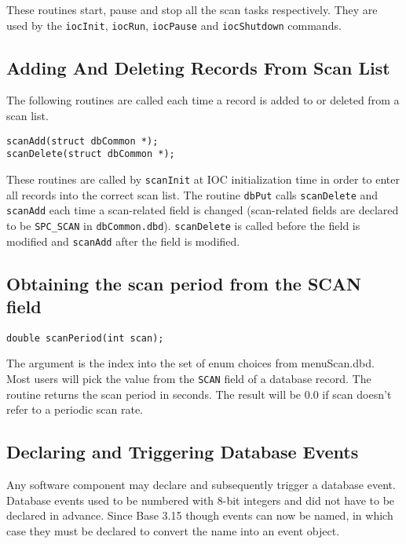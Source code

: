 These routines start, pause and stop all the scan tasks respectively.
They are used by the \verb|iocInit|, \verb|iocRun|, \verb|iocPause| and \verb|iocShutdown| commands.

\subsection{Adding And Deleting Records From Scan List}

The following routines are called each time a record is added to or deleted from a scan list.

\begin{verbatim}
scanAdd(struct dbCommon *);
scanDelete(struct dbCommon *);
\end{verbatim}

These routines are called by \verb|scanInit| at IOC initialization time in order to enter all records into the correct scan list.
The routine \verb|dbPut| calls \verb|scanDelete| and \verb|scanAdd| each time a scan-related field is changed (scan-related fields are declared to be \verb|SPC_SCAN| in \verb|dbCommon.dbd|).
\verb|scanDelete| is called before the field is modified and \verb|scanAdd| after the field is modified.

\subsection{Obtaining the scan period from the SCAN field}

\begin{verbatim}
double scanPeriod(int scan);
\end{verbatim}

The argument is the index into the set of enum choices from menuScan.dbd.
Most users will pick the value from the \verb|SCAN| field of a database record.
The routine returns the scan period in seconds.
The result will be 0.0 if scan doesn't refer to a periodic scan rate.

\subsection{Declaring and Triggering Database Events}

Any software component may declare and subsequently trigger a database event.
Database events used to be numbered with 8-bit integers and did not have to be declared in advance.
Since Base 3.15 though events can now be named, in which case they must be declared to convert the name into an event object.

